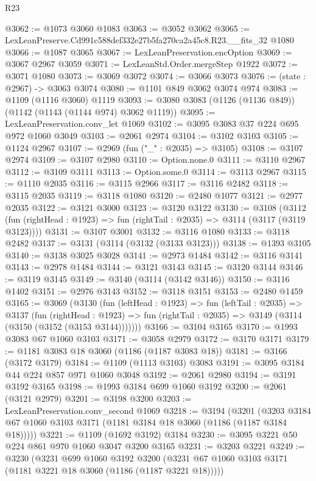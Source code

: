 \begin{lexlean}{R23}
\begin{coremodule}
@3062 := @1073 @3060 @1083
@3063 := @3052 @3062
@3065 := LexLeanPreserve.Cd991c588def332e27b5fa270ca2a45c8.R23.__fits_32 @1080
@3066 := @1087 @3065
@3067 := LexLeanPreservation.encOption
@3069 := @3067 @2967 @3059
@3071 := LexLeanStd.Order.mergeStep @1922
@3072 := @3071 @1080
@3073 := @3069 @3072
@3074 := @3066 @3073
@3076 := (state : @2967) -> @3063 @3074
@3080 := @1101 @849 @3062 @3074 @974
@3083 := @1109 (@1116 @3060) @1119
@3093 := @3080 @3083 (@1126 (@1136 @849)) (@1142 (@1143 (@1144 @974) @3062 @1119))
@3095 := LexLeanPreservation.conv_let @1069
@3102 := @3095 @3083 @37 @224 @695 @972 @1060 @3049
@3103 := @2061 @2974
@3104 := @3102 @3103
@3105 := @1124 @2967
@3107 := @2969 (fun ("_" : @2035) => @3105)
@3108 := @3107 @2974
@3109 := @3107 @2980
@3110 := Option.none.{0}
@3111 := @3110 @2967
@3112 := @3109 @3111
@3113 := Option.some.{0}
@3114 := @3113 @2967
@3115 := @1110 @2035
@3116 := @3115 @2966
@3117 := @3116 @2482
@3118 := @3115 @2035
@3119 := @3118 @1080
@3120 := @2480 @1077
@3121 := @2977 @2035
@3122 := @3121 @3000
@3123 := @3120 @3122
@3130 := @3108
    (@3112 (fun (rightHead : @1923) => fun (rightTail : @2035) => @3114 (@3117 (@3119 @3123))))
@3131 := @3107 @3001
@3132 := @3116 @1080
@3133 := @3118 @2482
@3137 := @3131 (@3114 (@3132 (@3133 @3123)))
@3138 := @1393 @3105
@3140 := @3138 @3025 @3028
@3141 := @2973 @1484
@3142 := @3116 @3141
@3143 := @2978 @1484
@3144 := @3121 @3143
@3145 := @3120 @3144
@3146 := @3119 @3145
@3149 := @3140 (@3114 (@3142 @3146))
@3150 := @3116 @1402
@3151 := @2976 @3143
@3152 := @3118 @3151
@3153 := @2480 @1459
@3165 := @3069
    (@3130
      (fun (leftHead : @1923) =>
      fun (leftTail : @2035) =>
      @3137
        (fun (rightHead : @1923) =>
        fun (rightTail : @2035) => @3149 (@3114 (@3150 (@3152 (@3153 @3144)))))))
@3166 := @3104 @3165
@3170 := @1993 @3083 @67 @1060 @3103
@3171 := @3058 @2979
@3172 := @3170 @3171
@3179 := @1181 @3083 @18 @3060 (@1186 (@1187 @3083 @18))
@3181 := @3166 (@3172 @3179)
@3184 := @1109 (@1113 @3103) @3083
@3191 := @3095 @3184 @44 @224 @857 @971 @1060 @3048
@3192 := @2061 @2980
@3194 := @3191 @3192 @3165
@3198 := @1993 @3184 @699 @1060 @3192
@3200 := @2061 (@3121 @2979)
@3201 := @3198 @3200
@3203 := LexLeanPreservation.conv_second @1069
@3218 := @3194
    (@3201 (@3203 @3184 @67 @1060 @3103 @3171 (@1181 @3184 @18 @3060 (@1186 (@1187 @3184 @18)))))
@3221 := @1109 (@1692 @3192) @3184
@3230 := @3095 @3221 @50 @224 @861 @970 @1060 @3047 @3200 @3165
@3231 := @3203 @3221
@3249 := @3230
    (@3231
      @699
      @1060
      @3192
      @3200
      (@3231 @67 @1060 @3103 @3171 (@1181 @3221 @18 @3060 (@1186 (@1187 @3221 @18)))))

\end{coremodule}
\end{lexlean}
